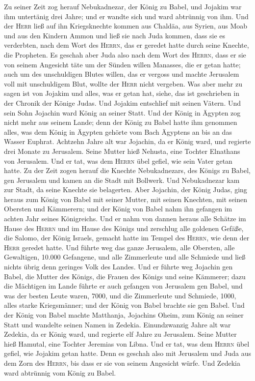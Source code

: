  Zu seiner Zeit zog herauf Nebukadnezar, der König zu
Babel, und Jojakim war ihm untertänig drei Jahre; und er wandte sich und
ward abtrünnig von ihm.  Und der \textsc{Herr} ließ auf
ihn Kriegsknechte kommen aus Chaldäa, aus Syrien, aus Moab und aus den
Kindern Ammon und ließ sie nach Juda kommen, dass sie es verderbten,
nach dem Wort des \textsc{Herrn}, das er geredet hatte durch seine
Knechte, die Propheten.  Es geschah aber Juda also nach
dem Wort des \textsc{Herrn}, dass er sie von seinem Angesicht täte um
der Sünden willen Manasses, die er getan hatte;  auch um
des unschuldigen Blutes willen, das er vergoss und machte Jerusalem voll
mit unschuldigem Blut, wollte der \textsc{Herr} nicht vergeben.
 Was aber mehr zu sagen ist von Jojakim und alles, was er
getan hat, siehe, das ist geschrieben in der Chronik der Könige Judas.
 Und Jojakim entschlief mit seinen Vätern. Und sein Sohn
Jojachin ward König an seiner Statt.  Und der König in
Ägypten zog nicht mehr aus seinem Lande; denn der König zu Babel hatte
ihm genommen alles, was dem König in Ägypten gehörte vom Bach Ägyptens
an bis an das Wasser Euphrat.  Achtzehn Jahre alt war
Jojachin, da er König ward, und regierte drei Monate zu Jerusalem. Seine
Mutter hieß Nehusta, eine Tochter Elnathans von Jerusalem.
 Und er tat, was dem \textsc{Herrn} übel gefiel, wie sein
Vater getan hatte.  Zu der Zeit zogen herauf die Knechte
Nebukadnezars, des Königs zu Babel, gen Jerusalem und kamen an die Stadt
mit Bollwerk.  Und Nebukadnezar kam zur Stadt, da seine
Knechte sie belagerten.  Aber Jojachin, der König Judas,
ging heraus zum König von Babel mit seiner Mutter, mit seinen Knechten,
mit seinen Obersten und Kämmerern; und der König von Babel nahm ihn
gefangen im achten Jahr seines Königreichs.  Und er nahm
von dannen heraus alle Schätze im Hause des \textsc{Herrn} und im Hause
des Königs und zerschlug alle goldenen Gefäße, die Salomo, der König
Israels, gemacht hatte im Tempel des \textsc{Herrn}, wie denn der
\textsc{Herr} geredet hatte.  Und führte weg das ganze
Jerusalem, alle Obersten, alle Gewaltigen, 10.000 Gefangene, und alle
Zimmerleute und alle Schmiede und ließ nichts übrig denn geringes Volk
des Landes.  Und er führte weg Jojachin gen Babel, die
Mutter des Königs, die Frauen des Königs und seine Kämmerer; dazu die
Mächtigen im Lande führte er auch gefangen von Jerusalem gen Babel,
 und was der besten Leute waren, 7000, und die
Zimmerleute und Schmiede, 1000, alles starke Kriegsmänner; und der König
von Babel brachte sie gen Babel.  Und der König von Babel
machte Matthanja, Jojachins Oheim, zum König an seiner Statt und
wandelte seinen Namen in Zedekia.  Einundzwanzig Jahre
alt war Zedekia, da er König ward, und regierte elf Jahre zu Jerusalem.
Seine Mutter hieß Hamutal, eine Tochter Jeremias von Libna.
 Und er tat, was dem \textsc{Herrn} übel gefiel, wie
Jojakim getan hatte.  Denn es geschah also mit Jerusalem
und Juda aus dem Zorn des \textsc{Herrn}, bis dass er sie von seinem
Angesicht würfe. Und Zedekia ward abtrünnig vom König zu Babel.

